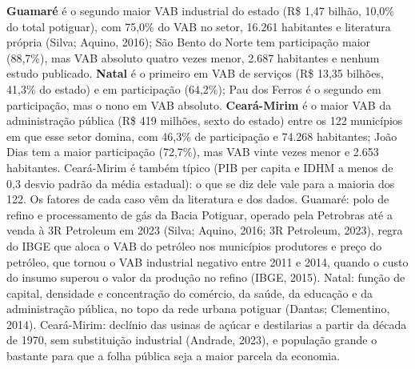 \documentclass[12pt,a4paper]{article}
\begin{document}
\textbf{Guamaré} é o segundo maior VAB industrial do estado (R\$ 1,47 bilhão, 10,0\% do total potiguar), com 75,0\% do VAB no setor, 16.261 habitantes e literatura própria (Silva; Aquino, 2016); São Bento do Norte tem participação maior (88,7\%), mas VAB absoluto quatro vezes menor, 2.687 habitantes e nenhum estudo publicado. \textbf{Natal} é o primeiro em VAB de serviços (R\$ 13,35 bilhões, 41,3\% do estado) e em participação (64,2\%); Pau dos Ferros é o segundo em participação, mas o nono em VAB absoluto. \textbf{Ceará-Mirim} é o maior VAB da administração pública (R\$ 419 milhões, sexto do estado) entre os 122 municípios em que esse setor domina, com 46,3\% de participação e 74.268 habitantes; João Dias tem a maior participação (72,7\%), mas VAB vinte vezes menor e 2.653 habitantes. Ceará-Mirim é também típico (PIB per capita e IDHM a menos de 0,3 desvio padrão da média estadual): o que se diz dele vale para a maioria dos 122. Os fatores de cada caso vêm da literatura e dos dados. Guamaré: polo de refino e processamento de gás da Bacia Potiguar, operado pela Petrobras até a venda à 3R Petroleum em 2023 (Silva; Aquino, 2016; 3R Petroleum, 2023), regra do IBGE que aloca o VAB do petróleo nos municípios produtores e preço do petróleo, que tornou o VAB industrial negativo entre 2011 e 2014, quando o custo do insumo superou o valor da produção no refino (IBGE, 2015). Natal: função de capital, densidade e concentração do comércio, da saúde, da educação e da administração pública, no topo da rede urbana potiguar (Dantas; Clementino, 2014). Ceará-Mirim: declínio das usinas de açúcar e destilarias a partir da década de 1970, sem substituição industrial (Andrade, 2023), e população grande o bastante para que a folha pública seja a maior parcela da economia.
\end{document}
